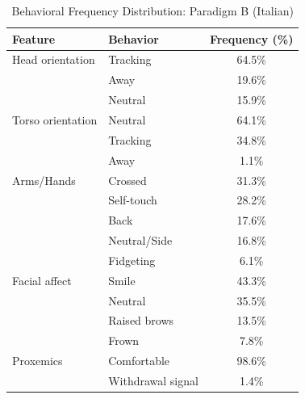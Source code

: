 \begin{table}[ht]
\centering
\caption{Behavioral Frequency Distribution: Paradigm B (Italian)}
\begin{tabular}{llc}
\toprule
Feature & Behavior & Frequency (\%) \\
\midrule
Head orientation & Tracking & 64.5\% \\
 & Away & 19.6\% \\
 & Neutral & 15.9\% \\
Torso orientation & Neutral & 64.1\% \\
 & Tracking & 34.8\% \\
 & Away & 1.1\% \\
Arms/Hands & Crossed & 31.3\% \\
 & Self-touch & 28.2\% \\
 & Back & 17.6\% \\
 & Neutral/Side & 16.8\% \\
 & Fidgeting & 6.1\% \\
Facial affect & Smile & 43.3\% \\
 & Neutral & 35.5\% \\
 & Raised brows & 13.5\% \\
 & Frown & 7.8\% \\
Proxemics & Comfortable & 98.6\% \\
 & Withdrawal signal & 1.4\% \\
\bottomrule
\end{tabular}
\end{table}